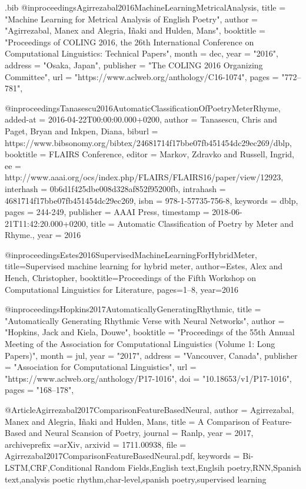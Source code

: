 \begin{filecontents}{\jobname.bib}
@inproceedings{Agirrezabal2016MachineLearningMetricalAnalysis,
	title = "Machine Learning for Metrical Analysis of {E}nglish Poetry",
	author = "Agirrezabal, Manex  and Alegria, I{\~n}aki  and Hulden, Mans",
	booktitle = "Proceedings of {COLING} 2016, the 26th International Conference on Computational Linguistics: Technical Papers",
	month = dec,
	year = "2016",
	address = "Osaka, Japan",
	publisher = "The COLING 2016 Organizing Committee",
	url = "https://www.aclweb.org/anthology/C16-1074",
	pages = "772--781",
}


@inproceedings{Tanasescu2016AutomaticClassificationOfPoetryMeterRhyme,
	added-at = {2016-04-22T00:00:00.000+0200},
	author = {Tanasescu, Chris and Paget, Bryan and Inkpen, Diana},
	biburl = {https://www.bibsonomy.org/bibtex/24681714f17bbe07fb451454dc29ec269/dblp},
	booktitle = {FLAIRS Conference},
	editor = {Markov, Zdravko and Russell, Ingrid},
	ee = {http://www.aaai.org/ocs/index.php/FLAIRS/FLAIRS16/paper/view/12923},
	interhash = {0b6d1f425dbe008d328af852f95200fb},
	intrahash = {4681714f17bbe07fb451454dc29ec269},
	isbn = {978-1-57735-756-8},
	keywords = {dblp},
	pages = {244-249},
	publisher = {AAAI Press},
	timestamp = {2018-06-21T11:42:20.000+0200},
	title = {Automatic Classification of Poetry by Meter and Rhyme.},
	year = 2016
}



@inproceedings{Estes2016SupervisedMachineLearningForHybridMeter,
	title={Supervised machine learning for hybrid meter},
	author={Estes, Alex and Hench, Christopher},
	booktitle={Proceedings of the Fifth Workshop on Computational Linguistics for Literature},
	pages={1--8},
	year={2016}
}


@inproceedings{Hopkins2017AutomaticallyGeneratingRhythmic,
	title = "Automatically Generating Rhythmic Verse with Neural Networks",
	author = "Hopkins, Jack  and Kiela, Douwe",
	booktitle = "Proceedings of the 55th Annual Meeting of the Association for Computational Linguistics (Volume 1: Long Papers)",
	month = jul,
	year = "2017",
	address = "Vancouver, Canada",
	publisher = "Association for Computational Linguistics",
	url = "https://www.aclweb.org/anthology/P17-1016",
	doi = "10.18653/v1/P17-1016",
	pages = "168--178",
}

@Article{Agirrezabal2017ComparisonFeatureBasedNeural,
	author =	 {Agirrezabal, Manex and Alegria, I{\~{n}}aki and Hulden, Mans},
	title =	 {{A Comparison of Feature-Based and Neural Scansion of Poetry}},
	journal =	 {Ranlp},
	year =	 2017,
	archiveprefix ={arXiv},
	arxivid =	 {1711.00938},
	file =	 {Agirrezabal2017ComparisonFeatureBasedNeural.pdf},
	keywords =	 {Bi-LSTM,CRF,Conditional Random Fields,English text,Englsih poetry,RNN,Spanish
		text,analysis poetic rhythm,char-level,spanish poetry,supervised learning}}



\end{filecontents}


